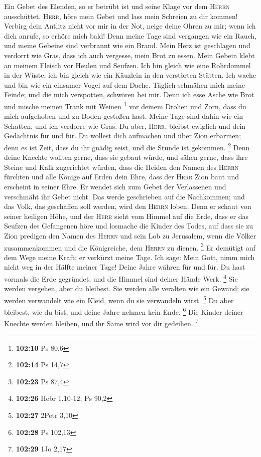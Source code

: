  Ein Gebet des Elenden, so er betrübt ist und seine Klage
vor dem \textsc{Herrn} ausschüttet.  \textsc{Herr}, höre
mein Gebet und lass mein Schreien zu dir kommen!  Verbirg
dein Antlitz nicht vor mir in der Not, neige deine Ohren zu mir; wenn
ich dich anrufe, so erhöre mich bald!  Denn meine Tage
sind vergangen wie ein Rauch, und meine Gebeine sind verbrannt wie ein
Brand.  Mein Herz ist geschlagen und verdorrt wie Gras,
dass ich auch vergesse, mein Brot zu essen.  Mein Gebein
klebt an meinem Fleisch vor Heulen und Seufzen.  Ich bin
gleich wie eine Rohrdommel in der Wüste; ich bin gleich wie ein Käuzlein
in den verstörten Stätten.  Ich wache und bin wie ein
einsamer Vogel auf dem Dache.  Täglich schmähen mich meine
Feinde; und die mich verspotten, schwören bei mir.  Denn
ich esse Asche wie Brot und mische meinen Trank mit Weinen \footnote{\textbf{102:10}
  Ps 80,6}  vor deinem Drohen und Zorn, dass du mich
aufgehoben und zu Boden gestoßen hast.  Meine Tage sind
dahin wie ein Schatten, und ich verdorre wie Gras.  Du
aber, \textsc{Herr}, bleibst ewiglich und dein Gedächtnis für und für.
 Du wollest dich aufmachen und über Zion erbarmen; denn
es ist Zeit, dass du ihr gnädig seist, und die Stunde ist gekommen.
\footnote{\textbf{102:14} Ps 14,7}  Denn deine Knechte
wollten gerne, dass sie gebaut würde, und sähen gerne, dass ihre Steine
und Kalk zugerichtet würden,  dass die Heiden den Namen
des \textsc{Herrn} fürchten und alle Könige auf Erden dein Ehre,
 dass der \textsc{Herr} Zion baut und erscheint in seiner
Ehre.  Er wendet sich zum Gebet der Verlassenen und
verschmäht ihr Gebet nicht.  Das werde geschrieben auf
die Nachkommen; und das Volk, das geschaffen soll werden, wird den
\textsc{Herrn} loben.  Denn er schaut von seiner heiligen
Höhe, und der \textsc{Herr} sieht vom Himmel auf die Erde,
 dass er das Seufzen des Gefangenen höre und losmache die
Kinder des Todes,  auf dass sie zu Zion predigen den
Namen des \textsc{Herrn} und sein Lob zu Jerusalem,  wenn
die Völker zusammenkommen und die Königreiche, dem \textsc{Herrn} zu
dienen. \footnote{\textbf{102:23} Ps 87,4}  Er demütigt
auf dem Wege meine Kraft; er verkürzt meine Tage.  Ich
sage: Mein Gott, nimm mich nicht weg in der Hälfte meiner Tage! Deine
Jahre währen für und für.  Du hast vormals die Erde
gegründet, und die Himmel sind deiner Hände Werk. \footnote{\textbf{102:26}
  Hebr 1,10-12; Ps 90,2}  Sie werden vergehen, aber du
bleibest. Sie werden alle veralten wie ein Gewand; sie werden verwandelt
wie ein Kleid, wenn du sie verwandeln wirst. \footnote{\textbf{102:27}
  2Petr 3,10}  Du aber bleibest, wie du bist, und deine
Jahre nehmen kein Ende. \footnote{\textbf{102:28} Ps 102,13}
 Die Kinder deiner Knechte werden bleiben, und ihr Same
wird vor dir gedeihen. \footnote{\textbf{102:29} 1Jo 2,17}

